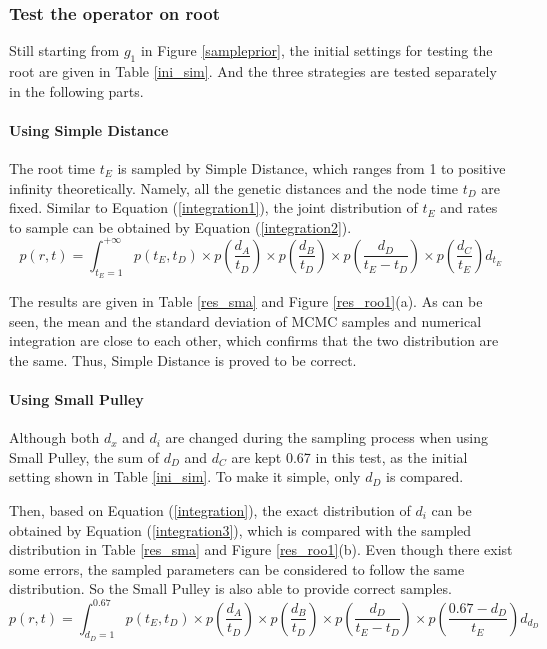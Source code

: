 \documentclass{bmcart}
\begin{document}
\begin{backmatter}
\subsubsection*{Test the operator on root}

Still starting from $g_1$ in Figure \ref{sampleprior}, the initial settings for testing the root are given in Table \ref{ini_sim}. And the three strategies are tested separately in the following parts.

\paragraph*{Using Simple Distance}

The root time $t_E$ is sampled by Simple Distance, which ranges from 1 to positive infinity theoretically. Namely, all the genetic distances and the node time $t_D$  are fixed. Similar to Equation (\ref{integration1}), the joint distribution of $t_E$ and rates to sample can be obtained by Equation (\ref{integration2}).
\begin{equation}
\label{integration2}
p(r,t) = \int_{{t_E} = 1}^{ + \infty } {p({t_E},{t_D}) \times p(\frac{{{d_A}}}{{{t_D}}}) \times p(\frac{{{d_B}}}{{{t_D}}}) \times p(\frac{{{d_D}}}{{{t_E} - {t_D}}}) \times p(\frac{{{d_C}}}{{{t_E}}}){d_{t_E}}}
\end{equation}

The results are given in Table \ref{res_sma} and Figure \ref{res_roo1}(a). As can be seen, the mean and the standard deviation of MCMC samples and numerical integration are close to each other, which confirms that the two distribution are the same. Thus, Simple Distance is proved to be correct.

\paragraph*{Using Small Pulley}

Although both ${d_x}$ and ${d_i}$ are changed during the sampling process when using Small Pulley, the sum of ${d_D}$ and ${d_C}$ are kept 0.67 in this test, as the initial setting shown in Table \ref{ini_sim}. To make it simple, only ${d_D}$ is compared.

Then, based on Equation (\ref{integration}), the exact distribution of ${d_i}$ can be obtained by Equation (\ref{integration3}), which is compared with the sampled distribution in Table \ref{res_sma} and Figure \ref{res_roo1}(b). Even though there exist some errors, the sampled parameters can be considered to follow the same distribution. So the Small Pulley is also able to provide correct samples.
\begin{equation}\label{integration3}
p(r,t) = \int_{{d_D} = 1}^{0.67} {p({t_E},{t_D}) \times p(\frac{{{d_A}}}{{{t_D}}}) \times p(\frac{{{d_B}}}{{{t_D}}}) \times p(\frac{{{d_D}}}{{{t_E} - {t_D}}}) \times p(\frac{{0.67 - {d_D}}}{{{t_E}}}){d_{d_D}}}
\end{equation}


\end{backmatter}
\end{document}
